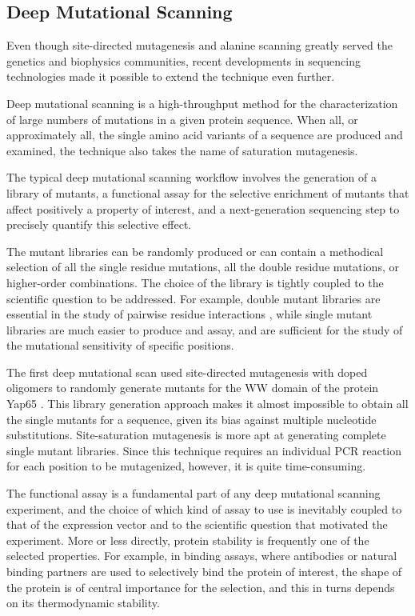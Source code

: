 \subsection{Deep Mutational Scanning}
Even though site-directed mutagenesis and alanine scanning greatly served the genetics and biophysics communities, recent developments in sequencing technologies made it possible to extend the technique even further.

Deep mutational scanning \parencite{Fowler2010, Fowler2014} is a high-throughput method for the characterization of large numbers of mutations in a given protein sequence.
When all, or approximately all, the single amino acid variants of a sequence are produced and examined, the technique also takes the name of saturation mutagenesis.

The typical deep mutational scanning workflow involves the generation of a library of mutants, a functional assay for the selective enrichment of mutants that affect positively a property of interest, and a next-generation sequencing step to precisely quantify this selective effect.

The mutant libraries can be randomly produced or can contain a methodical selection of all the single residue mutations, all the double residue mutations, or higher-order combinations.
The choice of the library is tightly coupled to the scientific question to be addressed.
For example, double mutant libraries are essential in the study of pairwise residue interactions \parencite[as in][]{Olson2014}, while single mutant libraries are much easier to produce and assay, and are sufficient for the study of the mutational sensitivity of specific positions.

The first deep mutational scan used site-directed mutagenesis with doped oligomers \parencite{Knight2003} to randomly generate mutants for the WW domain of the protein Yap65 \parencite{Fowler2010}.
This library generation approach makes it almost impossible to obtain all the single mutants for a sequence, given its bias against multiple nucleotide substitutions.
Site-saturation mutagenesis \parencite{Jain2014} is more apt at generating complete single mutant libraries.
Since this technique requires an individual PCR reaction for each position to be mutagenized, however, it is quite time-consuming.

The functional assay is a fundamental part of any deep mutational scanning experiment, and the choice of which kind of assay to use is inevitably coupled to that of the expression vector and to the scientific question that motivated the experiment.
More or less directly, protein stability is frequently one of the selected properties.
For example, in binding assays, where antibodies or natural binding partners are used to selectively bind the protein of interest, the shape of the protein is of central importance for the selection, and this in turns depends on its thermodynamic stability.

